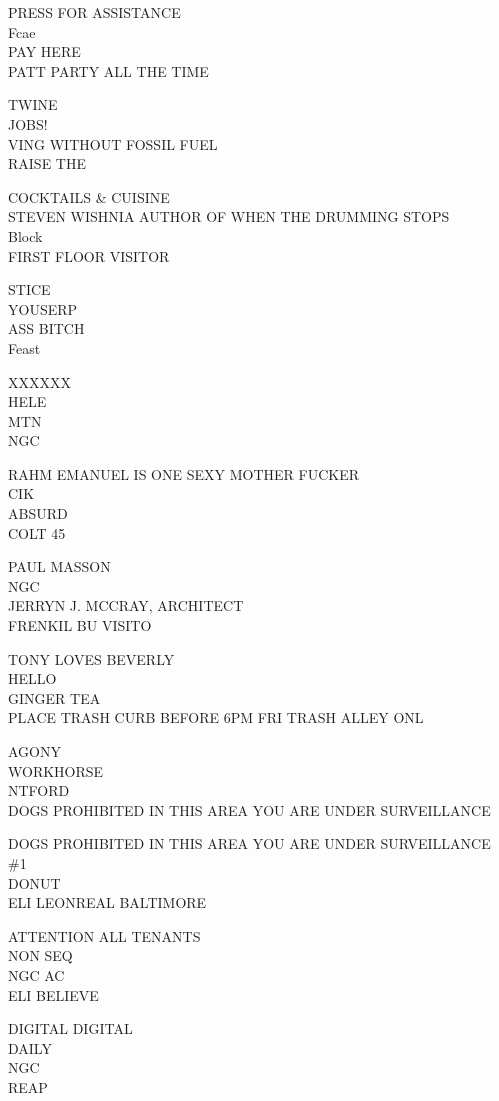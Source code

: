 \documentclass[10pt,letterpaper]{article}
\begin{document}
PRESS FOR ASSISTANCE\\
Fcae\\
PAY HERE\\
PATT PARTY ALL THE TIME

TWINE\\
JOBS!\\
VING WITHOUT FOSSIL FUEL\\
RAISE THE

COCKTAILS \& CUISINE\\
STEVEN WISHNIA AUTHOR OF WHEN THE DRUMMING STOPS\\
Block\\
FIRST FLOOR VISITOR

STICE\\
YOUSERP\\
ASS BITCH\\
Feast

XXXXXX\\
HELE\\
MTN\\
NGC

RAHM EMANUEL IS ONE SEXY MOTHER FUCKER\\
CIK\\
ABSURD\\
COLT 45

PAUL MASSON\\
NGC\\
JERRYN J. MCCRAY, ARCHITECT\\
FRENKIL BU VISITO

TONY LOVES BEVERLY\\
HELLO\\
GINGER TEA\\
PLACE TRASH CURB BEFORE 6PM FRI TRASH ALLEY ONL

AGONY\\
WORKHORSE\\
NTFORD\\
DOGS PROHIBITED IN THIS AREA YOU ARE UNDER SURVEILLANCE

DOGS PROHIBITED IN THIS AREA YOU ARE UNDER SURVEILLANCE\\
\#1\\
DONUT\\
ELI LEONREAL BALTIMORE

ATTENTION ALL TENANTS\\
NON SEQ\\
NGC AC\\
ELI BELIEVE

DIGITAL DIGITAL\\
DAILY\\
NGC\\
REAP
\end{document}
